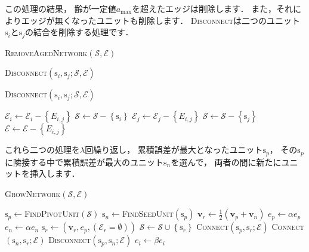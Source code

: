 ﻿\documentclass{jsarticle}
\begin{document}
この処理の結果，
齢が一定値$a_{\mathrm{max}}$を超えたエッジは削除します．
また，それによりエッジが無くなったユニットも削除します．
\textsc{Disconnect}は二つのユニット$\mathrm{s}_{i}$と$\mathrm{s}_{j}$の結合を削除する処理です．

\begin{algorithm}[tbh]
\caption{\textsc{RemoveAgedNetwork}$(\mathcal{S},\mathcal{E})$}
\begin{algorithmic}[1]
    \State \textsc{Disconnect}$(\mathrm{s}_{i}, \mathrm{s}_{j}; \mathcal{S},\mathcal{E})$
  \EndIf
\EndFor
\end{algorithmic}
\end{algorithm}

\begin{algorithm}[tbh]
\caption{\textsc{Disconnect}$(\mathrm{s}_{i},\mathrm{s}_{j}; \mathcal{S},\mathcal{E})$}
\begin{algorithmic}[1]
\State $\mathcal{E}_{i}\leftarrow\mathcal{E}_{i}-\left\{E_{i,j}\right\}$
  \State $\mathcal{S}\leftarrow\mathcal{S}-\left\{\mathrm{s}_{i}\right\}$
\EndIf
\State $\mathcal{E}_{j}\leftarrow\mathcal{E}_{j}-\left\{E_{i,j}\right\}$
  \State $\mathcal{S}\leftarrow\mathcal{S}-\left\{\mathrm{s}_{j}\right\}$
\EndIf
\State $\mathcal{E}\leftarrow\mathcal{E}-\left\{E_{i,j}\right\}$
\end{algorithmic}
\end{algorithm}

これら二つの処理を$\lambda$回繰り返し，
累積誤差が最大となったユニット$\mathrm{s}_{p}$，
その$\mathrm{s}_{p}$に隣接する中で累積誤差が最大のユニット$\mathrm{s}_{n}$を選んで，
両者の間に新たにユニットを挿入します．

\begin{algorithm}[tbh]
\caption{\textsc{GrowNetwork}$(\mathcal{S},\mathcal{E})$}
\begin{algorithmic}[1]
\State $\mathrm{s}_{p}\leftarrow$\textsc{FindPivotUnit}$(\mathcal{S})$
\State $\mathrm{s}_{n}\leftarrow$\textsc{FindSeedUnit}$(\mathrm{s}_{p})$
\State $\bm{v}_{r}\leftarrow\frac{1}{2}\left(\bm{v}_{p}+\bm{v}_{n}\right)$
\State $e_{p}\leftarrow\alpha e_{p}$
\State $e_{n}\leftarrow\alpha e_{n}$
\State $\mathrm{s}_{r}\leftarrow\left(\bm{v}_{r},e_{p},(\mathcal{E}_{r}=\emptyset)\right)$
\State $\mathcal{S}\leftarrow\mathcal{S}\cup\left\{\mathrm{s}_{r}\right\}$
\State \textsc{Connect}$\left(\mathrm{s}_{p}, \mathrm{s}_{r};\mathcal{E}\right)$
\State \textsc{Connect}$\left(\mathrm{s}_{n}, \mathrm{s}_{r};\mathcal{E}\right)$
\State \textsc{Disconnect}$\left(\mathrm{s}_{p}, \mathrm{s}_{n};\mathcal{E}\right)$
  \State $e_{i}\leftarrow\beta e_{i}$
\EndFor
\end{algorithmic}
\end{algorithm}
\end{document}
